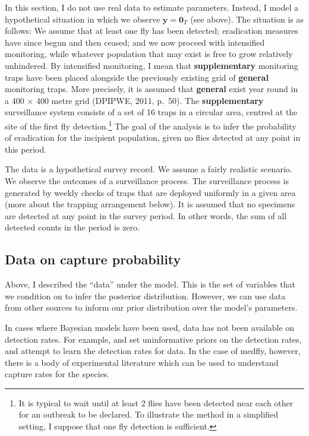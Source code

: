 \documentclass[
]{book}
\begin{document}
In this section, I do not use real data to estimate parameters. Instead, I model a hypothetical situation in which we observe \(\mathbf y = \mathbf 0_T\) (see above). The situation is as follows: We assume that at least one fly has been detected; eradication measures have since begun and then ceased; and we now proceed with intensified monitoring, while whatever population that may exist is free to grow relatively unhindered. By intensified monitoring, I mean that \textbf{supplementary} monitoring traps have been placed alongside the previously existing grid of \textbf{general} monitoring traps. More precisely, it is assumed that \textbf{general} exist year round in a 400 \(\times\) 400 metre grid (DPIPWE, 2011, p.~50). The \textbf{supplementary} surveillance system consists of a set of 16 traps in a circular area, centred at the site of the first fly detection.\footnote{It is typical to wait until at least 2 flies have been detected near each other for an outbreak to be declared. To illustrate the method in a simplified setting, I suppose that one fly detection is sufficient.} The goal of the analysis is to infer the probability of eradication for the incipient population, given no flies detected at any point in this period.

The data is a hypothetical survey record. We assume a fairly realistic scenario. We observe the outcomes of a surveillance process. The surveillance process is generated by weekly checks of traps that are deployed uniformly in a given area (more about the trapping arrangement below). It is assumed that no specimens are detected at any point in the survey period. In other words, the sum of all detected counts in the period is zero.

\hypertarget{data-on-capture-probability}{%
\subsection{Data on capture probability}\label{data-on-capture-probability}}

Above, I described the ``data'' under the model. This is the set of variables that we condition on to infer the posterior distribution. However, we can use data from other sources to inform our prior distribution over the model's parameters.

In cases where Bayesian models have been used, data has not been available on detection rates. For example, \citet{caley2014} and \citet{keith2013} set uninformative priors on the detection rates, and attempt to learn the detection rates for data. In the case of medfly, however, there is a body of experimental literature which can be used to understand capture rates for the species.
\end{document}
